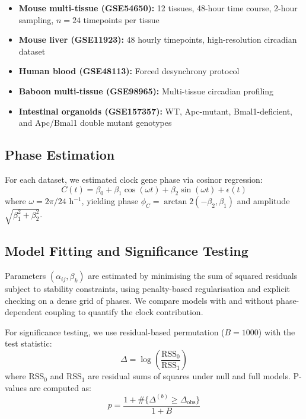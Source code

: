 \documentclass[11pt,letterpaper]{article}
\begin{document}
\begin{itemize}
\item \textbf{Mouse multi-tissue (GSE54650):} 12 tissues, 48-hour time course, 2-hour sampling, $n = 24$ timepoints per tissue \citep{zhang2014circadian}
\item \textbf{Mouse liver (GSE11923):} 48 hourly timepoints, high-resolution circadian dataset \citep{hughes2009harmonics}
\item \textbf{Human blood (GSE48113):} Forced desynchrony protocol \citep{archer2014mistimed}
\item \textbf{Baboon multi-tissue (GSE98965):} Multi-tissue circadian profiling \citep{mure2018diurnal}
\item \textbf{Intestinal organoids (GSE157357):} WT, Apc-mutant, Bmal1-deficient, and Apc/Bmal1 double mutant genotypes
\end{itemize}

\subsection{Phase Estimation}

For each dataset, we estimated clock gene phase via cosinor regression:
\begin{equation}
C(t) = \beta_0 + \beta_1 \cos(\omega t) + \beta_2 \sin(\omega t) + \epsilon(t)
\end{equation}
where $\omega = 2\pi/24$ h$^{-1}$, yielding phase $\phi_C = \arctan2(-\beta_2, \beta_1)$ and amplitude $\sqrt{\beta_1^2 + \beta_2^2}$.

\subsection{Model Fitting and Significance Testing}

Parameters $(\alpha_{ij}, \beta_k)$ are estimated by minimising the sum of squared residuals subject to stability constraints, using penalty-based regularisation and explicit checking on a dense grid of phases. We compare models with and without phase-dependent coupling to quantify the clock contribution.

For significance testing, we use residual-based permutation ($B = 1000$) with the test statistic:
\begin{equation}
\Delta = \log\left(\frac{\text{RSS}_0}{\text{RSS}_1}\right)
\end{equation}
where RSS$_0$ and RSS$_1$ are residual sums of squares under null and full models. P-values are computed as:
\begin{equation}
p = \frac{1 + \#\{\Delta^{(b)} \geq \Delta_{\text{obs}}\}}{1 + B}
\end{equation}
\end{document}
